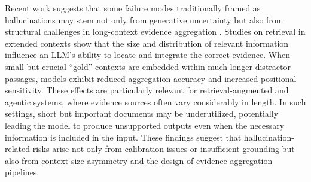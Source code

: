 Recent work suggests that some failure modes traditionally framed as hallucinations may stem not only from generative uncertainty but also from structural challenges in long-context evidence aggregation \cite{bianchi2025hidden}. Studies on retrieval in extended contexts show that the size and distribution of relevant information influence an LLM’s ability to locate and integrate the correct evidence. When small but crucial “gold” contexts are embedded within much longer distractor passages, models exhibit reduced aggregation accuracy and increased positional sensitivity. These effects are particularly relevant for retrieval-augmented and agentic systems, where evidence sources often vary considerably in length. In such settings, short but important documents may be underutilized, potentially leading the model to produce unsupported outputs even when the necessary information is included in the input. These findings suggest that hallucination-related risks arise not only from calibration issues or insufficient grounding but also from context-size asymmetry and the design of evidence-aggregation pipelines.


